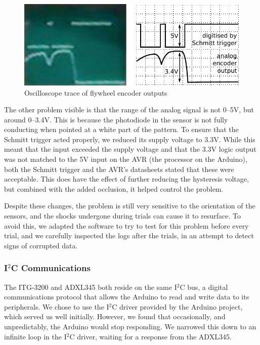 \documentclass{IIBproject}
\begin{document}
\begin{figure}[htpb]
  \begin{center}
    \includegraphics[width=13cm]{scope_trace.pdf}
    \end{center}
    \caption{Oscilloscope trace of flywheel encoder outputs}
    \label{fig:scope_trace}
    \end{figure}

The other problem visible is that the range of the analog signal is not 0--5V,
but around 0--3.4V. This is because the photodiode in the sensor is not fully
conducting when pointed at a white part of the pattern. To ensure that the
Schmitt trigger acted properly, we reduced its supply voltage to 3.3V. While
this meant that the input exceeded the supply voltage and that the 3.3V logic
output was not matched to the 5V input on the AVR (the processor on the
Arduino), both the Schmitt trigger and the AVR's datasheets stated that
these were acceptable\cite{ref:4093}\cite{ref:atmega}. This does have the
effect of further reducing the hysteresis voltage, but combined with the added
occlusion, it helped control the problem.

Despite these changes, the problem is still very sensitive to the orientation
of the sensors, and the shocks undergone during trials can cause it to
resurface. To avoid this, we adapted the software to try to test for this
problem before every trial, and we carefully inspected the logs after the
trials, in an attempt to detect signs of corrupted data.


\subsubsection{I$^2$C Communications}

The ITG-3200 and ADXL345 both reside on the same I$^2$C bus, a digital
communications protocol that allows the Arduino to read and write data to its
peripherals. We chose to use the I$^2$C driver provided by the Arduino
project, which served us well initially. However, we found that occasionally,
and unpredictably, the Arduino would stop responding. We narrowed this down to
an infinite loop in the I$^2$C driver, waiting for a response from the
ADXL345.
\end{document}

